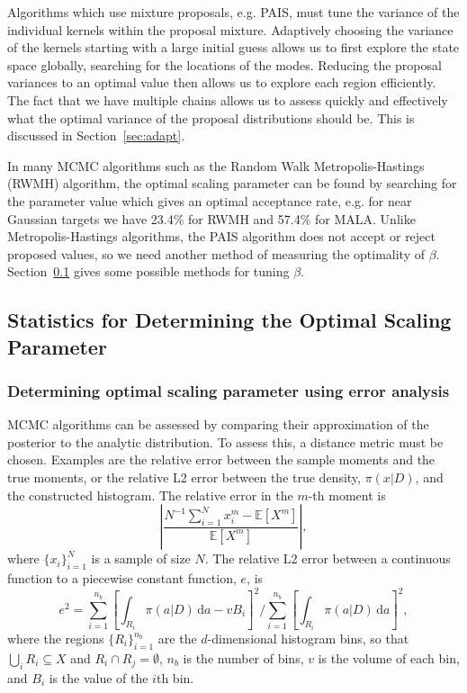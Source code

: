 \documentclass[final]{siamltex}
\begin{document}
Algorithms which use mixture proposals, e.g. PAIS, must tune the variance of the individual kernels within the proposal mixture. Adaptively choosing the variance of the kernels starting with a
large initial guess allows us to first explore the state space
globally, searching for the locations of the modes. Reducing the proposal variances to an
optimal value then allows us to explore each region efficiently. The
fact that we have multiple chains allows us to assess quickly and
effectively what the optimal variance of the proposal distributions
should be. This is discussed in Section~\ref{sec:adapt}.

In many MCMC algorithms such as the Random Walk Metropolis-Hastings (RWMH) algorithm, the optimal scaling parameter can be found by searching for the parameter value which gives an optimal acceptance rate, e.g. for near Gaussian targets we have 23.4\% for RWMH and 57.4\% for MALA\cite{roberts2001optimal}. Unlike Metropolis-Hastings algorithms, the PAIS algorithm does not accept or reject proposed values, so we need another method of measuring the optimality of $\beta$. Section~\ref{sec:statistics} gives some possible methods for tuning $\beta$.

\subsection{Statistics for Determining the Optimal Scaling Parameter}\label{sec:statistics}

\subsubsection{Determining optimal scaling parameter using error analysis}

MCMC algorithms can be assessed by comparing their approximation of the posterior to the analytic distribution. To assess this, a distance metric must be chosen. Examples are the relative error between the sample moments and the true moments, or the relative L2 error between the true density, $\pi(x|D)$, and the constructed histogram. The relative error in the $m$-th moment is
\[
	\left|\frac{N^{-1}\sum_{i=1}^N \! x_i^m - \mathbb{E}[X^m]}{\mathbb{E}[X^m]}\right|,
\]
where $\{x_i\}_{i=1}^N$ is a sample of size $N$. The relative L2 error between a continuous function to a piecewise constant function, $e$, is
\begin{equation}\label{eqn:L2_error}
	e^2 = \sum\limits_{i=1}^{n_b}\left[\displaystyle\int_{R_i} \! \pi(a|D) \, \mbox{d}a - vB_i\right]^2 \Big/ \sum\limits_{i=1}^{n_b}\left[\displaystyle\int_{R_i} \! \pi(a|D) \, \mbox{d}a\right]^2,
\end{equation}
where the regions $\{R_i\}_{i=1}^{n_b}$ are the $d$-dimensional histogram bins, so that $\bigcup_i R_i \subseteq X$ and $R_i\cap R_j=\emptyset$, $n_b$ is the number of bins, $v$ is the volume of each bin, and $B_i$ is the value of the $i$th bin. 
\end{document}
